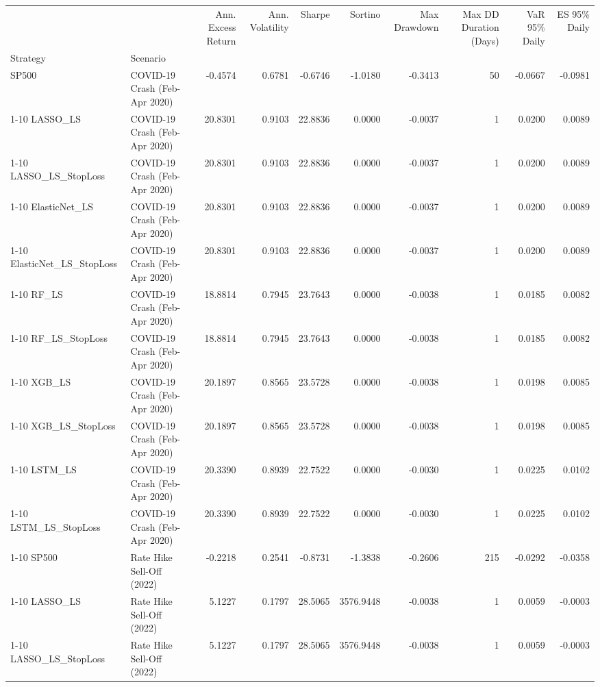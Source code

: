 \begin{tabular}{llrrrrrrrr}
\toprule
 &  & Ann. Excess Return & Ann. Volatility & Sharpe & Sortino & Max Drawdown & Max DD Duration (Days) & VaR 95\% Daily & ES 95\% Daily \\
Strategy & Scenario &  &  &  &  &  &  &  &  \\
\midrule
SP500 & COVID-19 Crash (Feb-Apr 2020) & -0.4574 & 0.6781 & -0.6746 & -1.0180 & -0.3413 & 50 & -0.0667 & -0.0981 \\
\cline{1-10}
LASSO\_LS & COVID-19 Crash (Feb-Apr 2020) & 20.8301 & 0.9103 & 22.8836 & 0.0000 & -0.0037 & 1 & 0.0200 & 0.0089 \\
\cline{1-10}
LASSO\_LS\_StopLoss & COVID-19 Crash (Feb-Apr 2020) & 20.8301 & 0.9103 & 22.8836 & 0.0000 & -0.0037 & 1 & 0.0200 & 0.0089 \\
\cline{1-10}
ElasticNet\_LS & COVID-19 Crash (Feb-Apr 2020) & 20.8301 & 0.9103 & 22.8836 & 0.0000 & -0.0037 & 1 & 0.0200 & 0.0089 \\
\cline{1-10}
ElasticNet\_LS\_StopLoss & COVID-19 Crash (Feb-Apr 2020) & 20.8301 & 0.9103 & 22.8836 & 0.0000 & -0.0037 & 1 & 0.0200 & 0.0089 \\
\cline{1-10}
RF\_LS & COVID-19 Crash (Feb-Apr 2020) & 18.8814 & 0.7945 & 23.7643 & 0.0000 & -0.0038 & 1 & 0.0185 & 0.0082 \\
\cline{1-10}
RF\_LS\_StopLoss & COVID-19 Crash (Feb-Apr 2020) & 18.8814 & 0.7945 & 23.7643 & 0.0000 & -0.0038 & 1 & 0.0185 & 0.0082 \\
\cline{1-10}
XGB\_LS & COVID-19 Crash (Feb-Apr 2020) & 20.1897 & 0.8565 & 23.5728 & 0.0000 & -0.0038 & 1 & 0.0198 & 0.0085 \\
\cline{1-10}
XGB\_LS\_StopLoss & COVID-19 Crash (Feb-Apr 2020) & 20.1897 & 0.8565 & 23.5728 & 0.0000 & -0.0038 & 1 & 0.0198 & 0.0085 \\
\cline{1-10}
LSTM\_LS & COVID-19 Crash (Feb-Apr 2020) & 20.3390 & 0.8939 & 22.7522 & 0.0000 & -0.0030 & 1 & 0.0225 & 0.0102 \\
\cline{1-10}
LSTM\_LS\_StopLoss & COVID-19 Crash (Feb-Apr 2020) & 20.3390 & 0.8939 & 22.7522 & 0.0000 & -0.0030 & 1 & 0.0225 & 0.0102 \\
\cline{1-10}
SP500 & Rate Hike Sell-Off (2022) & -0.2218 & 0.2541 & -0.8731 & -1.3838 & -0.2606 & 215 & -0.0292 & -0.0358 \\
\cline{1-10}
LASSO\_LS & Rate Hike Sell-Off (2022) & 5.1227 & 0.1797 & 28.5065 & 3576.9448 & -0.0038 & 1 & 0.0059 & -0.0003 \\
\cline{1-10}
LASSO\_LS\_StopLoss & Rate Hike Sell-Off (2022) & 5.1227 & 0.1797 & 28.5065 & 3576.9448 & -0.0038 & 1 & 0.0059 & -0.0003 \\

\end{tabular}
